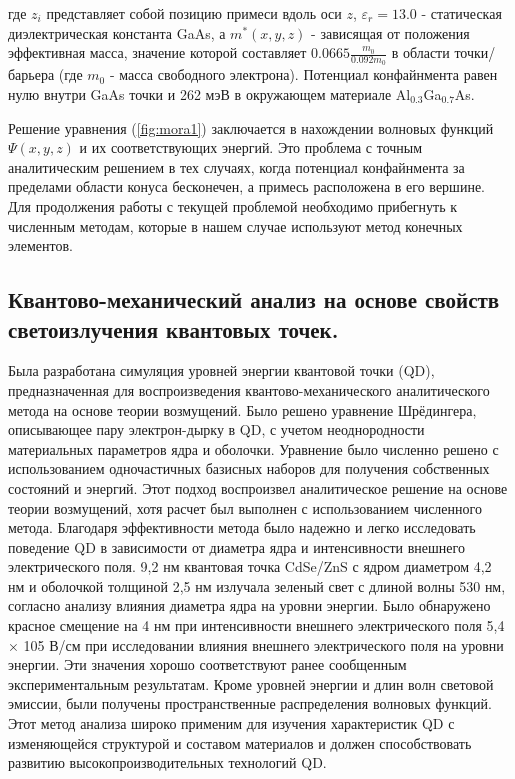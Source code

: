 \documentclass[a4paper,14pt]{extarticle}
\begin{document}
где $z_i$ представляет собой позицию примеси вдоль оси $z$, $\varepsilon_r = 13.0$ - статическая диэлектрическая константа GaAs, а $m^*(x, y, z)$ - зависящая от положения эффективная масса, значение которой составляет $0.0665 \frac{m_0}{0.092 m_0}$ в области точки/барьера (где $m_0$ - масса свободного электрона). Потенциал конфайнмента равен нулю внутри GaAs точки и 262 мэВ в окружающем материале Al$_{0.3}$Ga$_{0.7}$As.

Решение уравнения (\ref{fig:mora1}) заключается в нахождении волновых функций $\Psi(x, y, z)$ и их соответствующих энергий. Это проблема с точным аналитическим решением в тех случаях, когда потенциал конфайнмента за пределами области конуса бесконечен, а примесь расположена в его вершине. Для продолжения работы с текущей проблемой необходимо прибегнуть к численным методам, которые в нашем случае используют метод конечных элементов.

\subsection{Квантово-механический анализ на основе свойств светоизлучения квантовых точек.}

Была разработана симуляция уровней энергии квантовой точки (QD), предназначенная для воспроизведения квантово-механического аналитического метода на основе теории возмущений. Было решено уравнение Шрёдингера, описывающее пару электрон-дырку в QD, с учетом неоднородности материальных параметров ядра и оболочки. Уравнение было численно решено с использованием одночастичных базисных наборов для получения собственных состояний и энергий. Этот подход воспроизвел аналитическое решение на основе теории возмущений, хотя расчет был выполнен с использованием численного метода. Благодаря эффективности метода было надежно и легко исследовать поведение QD в зависимости от диаметра ядра и интенсивности внешнего электрического поля. 9,2 нм квантовая точка CdSe/ZnS с ядром диаметром 4,2 нм и оболочкой толщиной 2,5 нм излучала зеленый свет с длиной волны 530 нм, согласно анализу влияния диаметра ядра на уровни энергии. Было обнаружено красное смещение на 4 нм при интенсивности внешнего электрического поля 5,4 × 105 В/см при исследовании влияния внешнего электрического поля на уровни энергии. Эти значения хорошо соответствуют ранее сообщенным экспериментальным результатам. Кроме уровней энергии и длин волн световой эмиссии, были получены пространственные распределения волновых функций. Этот метод анализа широко применим для изучения характеристик QD с изменяющейся структурой и составом материалов и должен способствовать развитию высокопроизводительных технологий QD.
\end{document}

